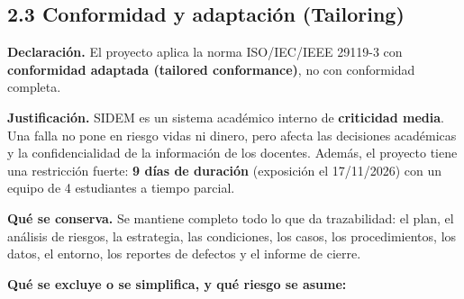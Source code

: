 \documentclass[11pt,a4paper,oneside]{report}
\begin{document}
\subsection*{2.3 Conformidad y adaptación (Tailoring)}

\textbf{Declaración.} El proyecto aplica la norma ISO/IEC/IEEE \mbox{29119-3} con \textbf{conformidad adaptada (tailored conformance)}, no con conformidad completa.


\textbf{Justificación.} SIDEM es un sistema académico interno de \textbf{criticidad media}. Una falla no pone en riesgo vidas ni dinero, pero afecta las decisiones académicas y la confidencialidad de la información de los docentes. Además, el proyecto tiene una restricción fuerte: \textbf{9 días de duración} (exposición el 17/11/2026) con un equipo de 4 estudiantes a tiempo parcial.


\textbf{Qué se conserva.} Se mantiene completo todo lo que da trazabilidad: el plan, el análisis de riesgos, la estrategia, las condiciones, los casos, los procedimientos, los datos, el entorno, los reportes de defectos y el informe de cierre.


\Needspace{150pt}\textbf{Qué se excluye o se simplifica, y qué riesgo se asume:}
\end{document}
